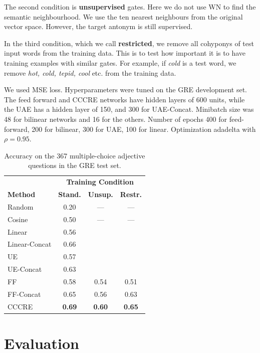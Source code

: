 \documentclass[11pt]{article}
\begin{document}
The second condition is {\bf unsupervised} gates. Here we do not use WN to find the semantic neighbourhood. We use the ten nearest neighbours from the original vector space. However, the target antonym is still supervised.

In the third condition, which we call {\bf restricted}, we remove all cohyponys of test input words from the training data. This is to test how important it is to have training examples with similar gates. For example, if {\it cold} is a test word, we remove {\it hot, cold, tepid, cool} etc. from the training data.

We used MSE loss. Hyperparameters were tuned on the GRE development set. The feed forward and CCCRE networks have hidden layers of 600 units, while the UAE has a hidden layer of 150, and 300 for UAE-Concat. Minibatch size was 48 for bilinear networks and 16 for the others. Number of epochs 400 for feed-forward, 200 for bilinear, 300 for UAE, 100 for linear. Optimization adadelta with $\rho = 0.95$.


\begin{table}[t!]
\begin{tabular}{lccc}
\hline
 & \multicolumn{3}{c}{\bf Training Condition} \\
\bf Method & \bf Stand. & \bf Unsup. & \bf Restr. \\
\hline
\hline
Random & 0.20 & --- & --- \\
Cosine & 0.50 & --- & --- \\
Linear & 0.56 & & \\
Linear-Concat & 0.66 & & \\
\hline
UE & 0.57 & & \\
UE-Concat & 0.63 & & \\
FF & 0.58 & 0.54 & 0.51 \\
FF-Concat & 0.65 & 0.56 & 0.63 \\
CCCRE & \bf 0.69 & \bf 0.60 & \bf 0.65 \\
\end{tabular} 
\label{t:gre}
\caption{Accuracy on the 367 multiple-choice adjective questions in the GRE test set.}
\end{table}


\section{Evaluation}
\end{document}
